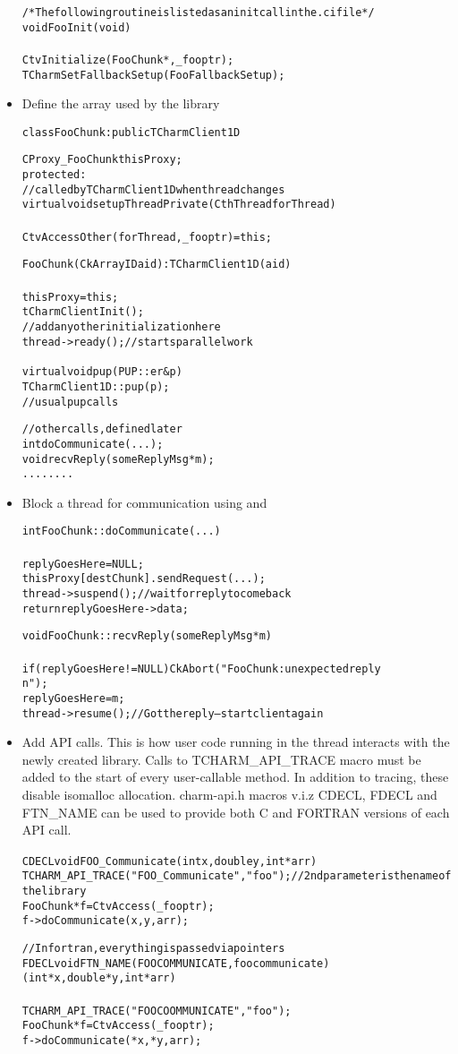 \documentclass[10pt]{article}
\begin{document}
\begin{itemize}
\begin{alltt}
/* The following routine is listed as an initcall in the .ci file */
void FooInit(void)
{
  CtvInitialize(FooChunk*, \_fooptr);
  TCharmSetFallbackSetup(FooFallbackSetup);
}
\end{alltt}

\item Define the array used by the library

\begin{alltt}
class FooChunk: public TCharmClient1D {
   CProxy\_FooChunk thisProxy;
protected:
   //called by TCharmClient1D when thread changes
   virtual void setupThreadPrivate(CthThread forThread)
   {
      CtvAccessOther(forThread, \_fooptr) = this;
   }
   
   FooChunk(CkArrayID aid):TCharmClient1D(aid)
   {
      thisProxy = this;
      tCharmClientInit();
      //add any other initialization here
      thread->ready(); //starts parallel work  
   }

   virtual void pup(PUP::er &p) {
     TCharmClient1D::pup(p);
     //usual pup calls
   }
   
   //other calls, defined later
   int doCommunicate(...);
   void recvReply(someReplyMsg *m);
   ........
}
\end{alltt}

\item Block a thread for communication using  and

\begin{alltt}
int FooChunk::doCommunicate(...)
{
   replyGoesHere = NULL;
   thisProxy[destChunk].sendRequest(...);
   thread->suspend(); //wait for reply to come back
   return replyGoesHere->data;
}

void FooChunk::recvReply(someReplyMsg *m)
{
  if(replyGoesHere!=NULL) CkAbort("FooChunk: unexpected reply\\n");
  replyGoesHere = m;
  thread->resume(); //Got the reply -- start client again
}
\end{alltt}

\item Add API calls. This is how user code running in the thread interacts
with the newly created library. Calls to TCHARM\_API\_TRACE macro must be 
added to the start of every user-callable method. In addition to tracing,
these disable isomalloc allocation. charm-api.h macros v.i.z CDECL, FDECL and
FTN\_NAME can be used to provide both C and FORTRAN versions of each API call.

\begin{alltt}
CDECL void FOO\_Communicate(int x, double y, int * arr) {
   TCHARM\_API\_TRACE("FOO\_Communicate", "foo"); //2nd parameter is the name of the library
   FooChunk *f = CtvAccess(\_fooptr);
   f->doCommunicate(x, y, arr);
}

//In fortran, everything is passed via pointers
FDECL void FTN\_NAME(FOOCOMMUNICATE, foocommunicate)
     (int *x, double *y, int *arr)
{
   TCHARM\_API\_TRACE("FOOCOOMMUNICATE", "foo");
   FooChunk *f = CtvAccess(\_fooptr);
   f->doCommunicate(*x, *y, arr); 
}
\end{alltt}

\end{itemize}


\end{document}

